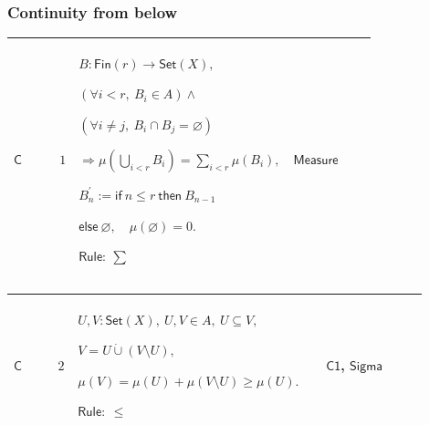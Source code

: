 \documentclass[12pt,reqno]{amsart}
\theoremstyle{blueplain}
\numberwithin{equation}{section}
\newlength{\DCTOneColumnBody}
\begin{document}
\subsubsection{\protect\scriptsize Continuity from below}

{\scriptsize \setlength{\parskip}{0pt}\nointerlineskip
\noindent 
\begin{tabular}{|@{}>{\centering\arraybackslash}m{\DCTOneColumnBody}|}
\hline
$\displaystyle \mathsf{Context\_C}:=$\par$\displaystyle E:\mathsf{PosNat}\to%
\mathsf{Set}(X),$\par$\displaystyle (\forall k:\mathsf{PosNat},\ E_k\in A)$%
\par$\displaystyle \land(\forall k:\mathsf{PosNat},\ E_k\subseteq E_{k+1}).$
\\ \hline
\end{tabular}%
}

{\scriptsize \setlength{\parskip}{0pt}\nointerlineskip
\noindent 
\begin{tabular}{|@{}>{\centering\arraybackslash}m{0.10658\linewidth}|>{\centering\arraybackslash}m{0.03553\linewidth}|>{\centering\arraybackslash}m{0.52105\linewidth}|>{\centering\arraybackslash}m{0.23684\linewidth}|}
\hline
\hypertarget{proof:C1}{$\displaystyle \mathsf{C}$} & $\displaystyle 1$ & $%
\displaystyle B:\mathsf{Fin}(r)\to\mathsf{Set}(X),$\par$\displaystyle %
(\forall i<r,\ B_i\in A)\land$\par$\displaystyle (\forall i\ne j,\ B_i\cap
B_j=\varnothing)$\par$\displaystyle \Rightarrow\mu(\bigcup_{i<r}B_i)=%
\sum_{i<r}\mu(B_i),$\par$\displaystyle B_n^\prime:=\mathsf{if}\ n\le r\ 
\mathsf{then}\ B_{n-1}$\par$\displaystyle \mathsf{else}\
\varnothing,\quad\mu(\varnothing)=0.$\par$\displaystyle \mathsf{Rule}:\ \sum$
& \hyperlink{ax:Measure}{$\displaystyle \mathsf{Measure}$} \\ \hline
\end{tabular}%
}

{\scriptsize \setlength{\parskip}{0pt}\nointerlineskip
\noindent 
\begin{tabular}{|@{}>{\centering\arraybackslash}m{0.10658\linewidth}|>{\centering\arraybackslash}m{0.03553\linewidth}|>{\centering\arraybackslash}m{0.52105\linewidth}|>{\centering\arraybackslash}m{0.23684\linewidth}|}
\hline
\hypertarget{proof:C2}{$\displaystyle \mathsf{C}$} & $\displaystyle 2$ & $%
\displaystyle U,V:\mathsf{Set}(X),\ U,V\in A,\ U\subseteq V,$\par$%
\displaystyle V=U\mathbin{\dot\cup}(V\setminus U),$\par$\displaystyle %
\mu(V)=\mu(U)+\mu(V\setminus U)\ge\mu(U).$\par$\displaystyle \mathsf{Rule}:\
\le$ & \hyperlink{proof:C1}{$\displaystyle \mathsf{C1}$}, \hyperlink{ax:Sigma}%
{$\displaystyle \mathsf{Sigma}$} \\ \hline
\end{tabular}%
}
\end{document}
